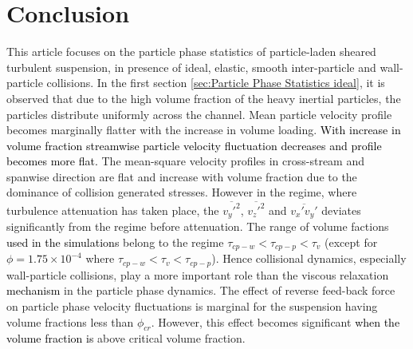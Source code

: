 \documentclass[notitlepage]{revtex4-1}
\begin{document}
\section{Conclusion}
This article focuses on the particle phase statistics of particle-laden sheared turbulent suspension, in presence of ideal, elastic, smooth inter-particle and wall-particle collisions. In the first section \ref{sec:Particle Phase Statistics ideal}, it is observed that due to the high volume fraction of the heavy inertial particles, the particles distribute uniformly across the channel. Mean particle velocity profile becomes marginally flatter with the increase in volume loading. 
\textcolor{black}{With increase in volume fraction streamwise particle velocity fluctuation decreases and profile becomes more flat.} The mean-square velocity profiles in cross-stream and spanwise direction are flat and increase with volume fraction due to the dominance of collision generated stresses. However in the regime, where turbulence attenuation has taken place, the $\overline{v_y'^2}$, $\overline{v_z'^2}$ and $\overline{v_x'v_y'}$ deviates significantly from the regime before attenuation.
The range of volume factions \textcolor{black}{used in the simulations} belong to the regime $\tau_{cp-w} < \tau_{cp-p} < \tau_v $ (except for $\phi=1.75\times10^{-4}$ where $\tau_{cp-w} < \tau_v< \tau_{cp-p} $). Hence collisional dynamics, especially  wall-particle collisions, play a more important role than the viscous relaxation \textcolor{black}{mechanism} in the particle phase dynamics. 
The effect of reverse feed-back force on particle phase velocity fluctuations is marginal for the suspension having volume fractions less than $\phi_{cr}$. However, this effect becomes significant \textcolor{black}{when the volume fraction is} above critical volume fraction.
\end{document}
